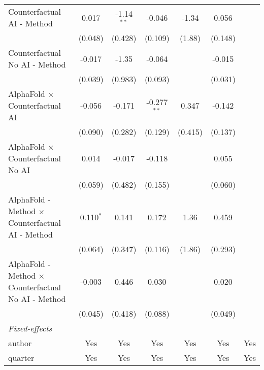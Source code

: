 \begin{tabular}{lcccccc}
   Counterfactual AI - Method                                 & 0.017         & -1.14$^{**}$ & -0.046        & -1.34       & 0.056          &   \\   
                                                              & (0.048)       & (0.428)      & (0.109)       & (1.88)      & (0.148)        &   \\   
   Counterfactual No AI - Method                              & -0.017        & -1.35        & -0.064        &             & -0.015         &   \\   
                                                              & (0.039)       & (0.983)      & (0.093)       &             & (0.031)        &   \\   
   AlphaFold $\times$ Counterfactual AI                       & -0.056        & -0.171       & -0.277$^{**}$ & 0.347       & -0.142         &   \\   
                                                              & (0.090)       & (0.282)      & (0.129)       & (0.415)     & (0.137)        &   \\   
   AlphaFold $\times$ Counterfactual No AI                    & 0.014         & -0.017       & -0.118        &             & 0.055          &   \\   
                                                              & (0.059)       & (0.482)      & (0.155)       &             & (0.060)        &   \\   
   AlphaFold - Method $\times$ Counterfactual AI - Method     & 0.110$^{*}$   & 0.141        & 0.172         & 1.36        & 0.459          &   \\   
                                                              & (0.064)       & (0.347)      & (0.116)       & (1.86)      & (0.293)        &   \\   
   AlphaFold - Method $\times$ Counterfactual No AI - Method  & -0.003        & 0.446        & 0.030         &             & 0.020          &   \\   
                                                              & (0.045)       & (0.418)      & (0.088)       &             & (0.049)        &   \\   
   \midrule
   \emph{Fixed-effects}\\
   author                                                     & Yes           & Yes          & Yes           & Yes         & Yes            & Yes\\  
   quarter                                                    & Yes           & Yes          & Yes           & Yes         & Yes            & Yes\\  

\end{tabular}

